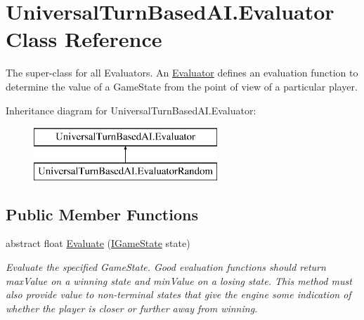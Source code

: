 \hypertarget{class_universal_turn_based_a_i_1_1_evaluator}{}\section{Universal\+Turn\+Based\+A\+I.\+Evaluator Class Reference}
\label{class_universal_turn_based_a_i_1_1_evaluator}


The super-\/class for all Evaluators. An \hyperlink{class_universal_turn_based_a_i_1_1_evaluator}{Evaluator} defines an evaluation function to determine the value of a Game\+State from the point of view of a particular player.  


Inheritance diagram for Universal\+Turn\+Based\+A\+I.\+Evaluator\+:\begin{figure}[H]
\begin{center}
\leavevmode
\includegraphics[height=2.000000cm]{class_universal_turn_based_a_i_1_1_evaluator}
\end{center}
\end{figure}
\subsection*{Public Member Functions}
\begin{DoxyCompactItemize}
\item 
abstract float \hyperlink{class_universal_turn_based_a_i_1_1_evaluator_afbe949f461f4d633732398c41428c618}{Evaluate} (\hyperlink{interface_universal_turn_based_a_i_1_1_i_game_state}{I\+Game\+State} state)
\begin{DoxyCompactList}\small\item\em Evaluate the specified Game\+State. Good evaluation functions should return max\+Value on a winning state and min\+Value on a losing state. This method must also provide value to non-\/terminal states that give the engine some indication of whether the player is closer or further away from winning. \end{DoxyCompactList}\end{DoxyCompactItemize}
